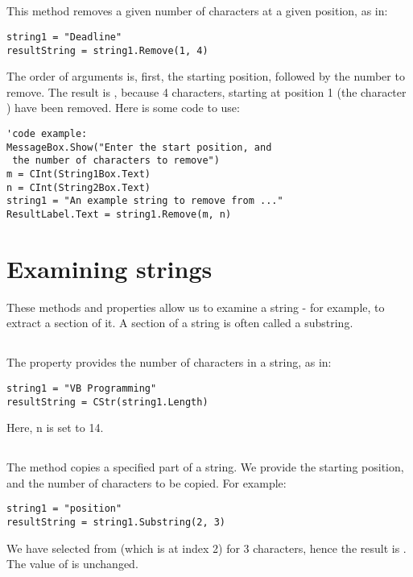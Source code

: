 		\subsection*{}
			This method removes a given number of characters at a given position, as in:
			\begin{lstlisting}
string1 = "Deadline"
resultString = string1.Remove(1, 4)
			\end{lstlisting}
			The order of arguments is, first, the starting position, followed by the number to remove. The result is , because 4 characters, starting at position 1 (the character ) have been removed. Here is some code to use:
			\begin{lstlisting}
'code example:
MessageBox.Show("Enter the start position, and 
 the number of characters to remove")
m = CInt(String1Box.Text)
n = CInt(String2Box.Text)
string1 = "An example string to remove from ..."
ResultLabel.Text = string1.Remove(m, n)
			\end{lstlisting}


	\section{Examining strings}
		These methods and properties allow us to examine a string - for example, to extract a section of it. A section of a string is often called a substring.

		\subsection*{}
			The  property provides the number of characters in a string, as in:
			\begin{lstlisting}
string1 = "VB Programming"
resultString = CStr(string1.Length)
			\end{lstlisting}
			Here, n is set to 14.

		\subsection*{}
			The  method copies a specified part of a string. We provide the starting position, and the number of characters to be copied. For example:
			\begin{lstlisting}
string1 = "position"
resultString = string1.Substring(2, 3)
			\end{lstlisting}
			We have selected from  (which is at index 2) for 3 characters, hence the result is . The value of  is unchanged. 
			

